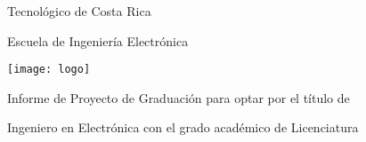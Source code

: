 
\thispagestyle{empty} 

\begin{center}

Tecnológico de Costa Rica

\par\vspace{1ex}

Escuela de Ingeniería Electrónica

\par\vspace{20mm}

\texttt{[image: logo]}

\par\vspace*{\fill}

{\large\bf{\scriptTitle}}

\par\vspace*{\fill}

Informe de Proyecto de Graduación para optar por el título de

Ingeniero en Electrónica con el grado académico de Licenciatura

\par\vspace{20mm}

\scriptAuthor

\vspace*{\fill}

\end{center}
\newpage 
\cleardoublepage 


